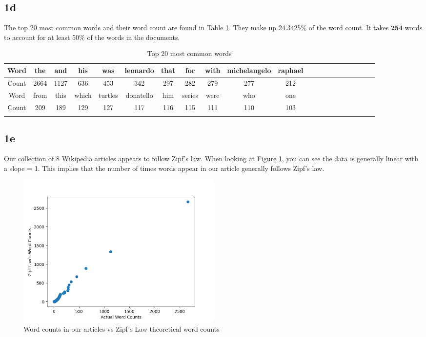 \documentclass[12pt]{article}
\begin{document}
\subsection*{1d}

The top 20 most common words and their word count are found in Table \ref{word_count}. They make up 24.3425\% of the word count. It takes $\mathbf{254}$ words to account for at least 50\% of the words in the documents.

\begin{table}[h!]
    \centering
    \caption{Top 20 most common words}
    \vspace*{4mm}
    \label{word_count}
    \begin{tabular}{c|cccccccccccccccccccc}
        \Xhline{3\arrayrulewidth}
        Word & the & and & his & was & leonardo & that & for & with & michelangelo & raphael\\\hline
        Count & 2664 & 1127 & 636 & 453 & 342 & 297 & 282 & 279 & 277 & 212 \\
        \Xhline{3\arrayrulewidth}
        Word &  from & this & which & turtles & donatello & him & series & were & who & one \\\hline
        Count & 209 & 189 & 129 & 127 & 117 & 116 & 115 & 111 & 110 & 103 \\
        \Xhline{3\arrayrulewidth}
    \end{tabular}
\end{table}

\newpage

\subsection*{1e}

Our collection of 8 Wikipedia articles appears to follow Zipf's law. When looking at Figure \ref{fig:zipf}, you can see the data is generally linear with a slope = 1. This implies that the number of times words appear in our article generally follows Zipf's law.

\begin{figure}[ht!]
    \centering
    \includegraphics[width=0.5\textwidth]{../plots/zipf_law.png}
    \caption{Word counts in our articles vs Zipf's Law theoretical word counts}
    \label{fig:zipf}
\end{figure}
\end{document}
